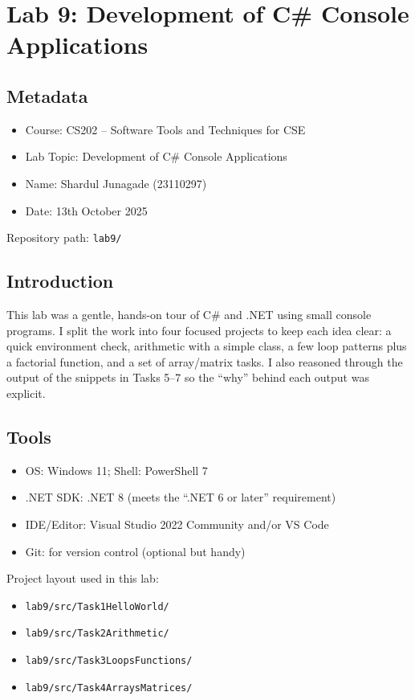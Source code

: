 \section{Lab 9: Development of C\# Console Applications}

\subsection*{Metadata}
\begin{itemize}
	\item Course: CS202 -- Software Tools and Techniques for CSE
	\item Lab Topic: Development of C\# Console Applications
	\item Name: Shardul Junagade (23110297)
	\item Date: 13th October 2025
\end{itemize}

Repository path: \texttt{lab9/}

\subsection{Introduction}
This lab was a gentle, hands-on tour of C\# and .NET using small console programs. I split the work into four focused projects to keep each idea clear: a quick environment check, arithmetic with a simple class, a few loop patterns plus a factorial function, and a set of array/matrix tasks. I also reasoned through the output of the snippets in Tasks 5--7 so the ``why'' behind each output was explicit.

\subsection{Tools}
\begin{itemize}[itemsep=0pt]
	\item OS: Windows 11; Shell: PowerShell 7
	\item .NET SDK: .NET 8 (meets the ``.NET 6 or later'' requirement)
	\item IDE/Editor: Visual Studio 2022 Community and/or VS Code
	\item Git: for version control (optional but handy)
\end{itemize}

Project layout used in this lab:
\begin{itemize}[itemsep=0pt]
	\item \texttt{lab9/src/Task1HelloWorld/}
	\item \texttt{lab9/src/Task2Arithmetic/}
	\item \texttt{lab9/src/Task3LoopsFunctions/}
	\item \texttt{lab9/src/Task4ArraysMatrices/}
\end{itemize}

